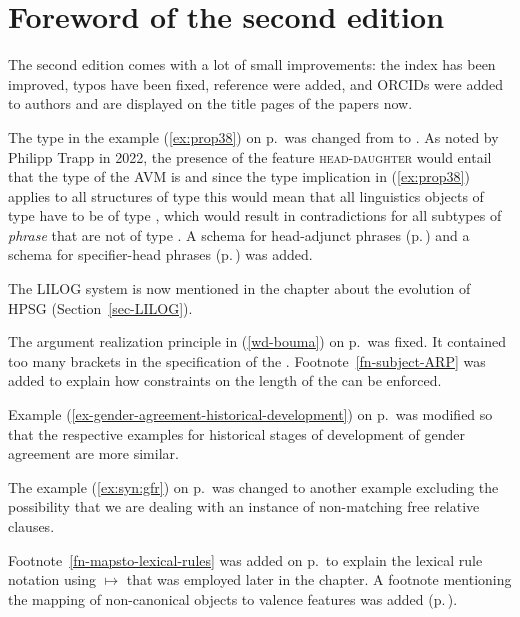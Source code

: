 \section*{Foreword of the second edition}

\largerpage
The second edition comes with a lot of small improvements: the index has been improved, typos have
been fixed, reference were added, and ORCIDs were added to authors and are displayed on the title pages of the papers now.

The type in the example (\ref{ex:prop38})
on p.\,\pageref{ex:prop38} was changed from  to . As noted by
Philipp Trapp in 2022, the presence of the feature \textsc{head-daughter} would entail that the type
of the AVM is  and since the type implication in (\ref{ex:prop38}) applies to all
structures of type  this would mean that all linguistics objects of type  have to be
of type , which would result in contradictions for all subtypes of \emph{phrase}
that are not of type . A schema for head-adjunct phrases (p.\,\pageref{ex-hd-adj-ph}) and a schema for
specifier-head phrases (p.\,\pageref{ex-head-spr-ph}) was added.

The LILOG system is now mentioned in the chapter about the evolution of HPSG (Section~\ref{sec-LILOG}).

The argument realization principle in (\ref{wd-bouma}) on p.\,\pageref{wd-bouma} was fixed. It
contained too many brackets in the specification of the \depsl. Footnote~\ref{fn-subject-ARP} was
added to explain how constraints on the length of the \subjl can be enforced.

Example (\ref{ex-gender-agreement-historical-development}) on
p.\,\pageref{ex-gender-agreement-historical-development} was modified so that the respective
examples for historical stages of development of gender agreement are more similar.

The example (\ref{ex:syn:gfr}) on p.\,\pageref{ex:syn:gfr} was changed to another example excluding the possibility that we
are dealing with an instance of non-matching free relative clauses.

Footnote~\ref{fn-mapsto-lexical-rules} was added on p.\,\pageref{fn-mapsto-lexical-rules} to explain
the lexical rule notation using $\mapsto$ that was employed later in the chapter. A footnote
mentioning the mapping of non-canonical objects to valence features was added (p.\,\pageref{fn-non-cannonical-arg-st}). 

